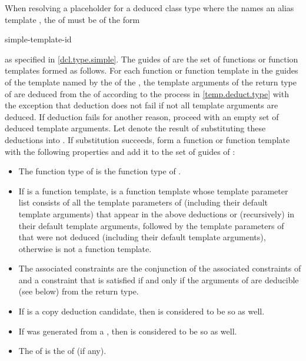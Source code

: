 \pnum
When resolving a placeholder for a deduced class type
where the  names an alias template ,
the  of  must be of the form
\begin{ncsimplebnf}
   simple-template-id
\end{ncsimplebnf}
as specified in \ref{dcl.type.simple}.
The guides of  are the set of functions or function templates
formed as follows.
For each function or function template  in the guides of
the template named by the 
of the ,
the template arguments of the return type of 
are deduced
from the  of 
according to the process in \ref{temp.deduct.type}
with the exception that deduction does not fail
if not all template arguments are deduced.
If deduction fails for another reason,
proceed with an empty set of deduced template arguments.
Let  denote the result of substituting
these deductions into .
If substitution succeeds,
form a function or function template 
with the following properties and add it to the set
of guides of :
\begin{itemize}
\item
The function type of  is the function type of .

\item
If  is a function template,
 is a function template whose
template parameter list consists of
all the template parameters of 
(including their default template arguments)
that appear in the above deductions or
(recursively) in their default template arguments,
followed by the template parameters of  that were not deduced
(including their default template arguments),
otherwise  is not a function template.

\item
The associated constraints are
the conjunction of the associated constraints of  and
a constraint that is satisfied if and only if
the arguments of  are deducible (see below) from the return type.

\item
If  is a copy deduction candidate,
then  is considered to be so as well.

\item
If  was generated
from a ,
then  is considered to be so as well.

\item
The  of  is
the  of  (if any).
\end{itemize}

